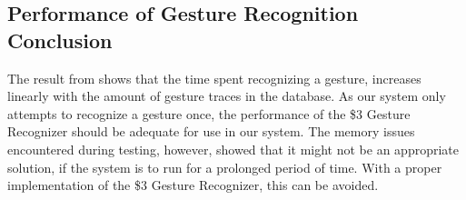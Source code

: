 
\subsection{Performance of Gesture Recognition Conclusion}
The result from  shows that the time spent recognizing a gesture, 
increases linearly with the amount of gesture traces in the database.
As our system only attempts to recognize a gesture once, 
the performance of the \$3 Gesture Recognizer should be adequate for use in our system. 
The memory issues encountered during testing, however, 
showed that it might not be an appropriate solution, 
if the system is to run for a prolonged period of time.
With a proper implementation of the \$3 Gesture Recognizer, 
this can be avoided. 
